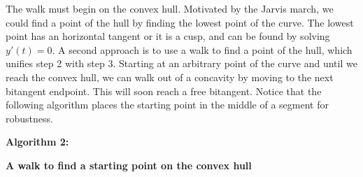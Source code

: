 \documentclass{sig-alternate}
\newcommand{\Comment}[1]{\relax}  %
\begin{document}
The walk must begin on the convex hull.
Motivated by the Jarvis march, we could find a point of the hull by finding the lowest
point of the curve.
The lowest point has an horizontal tangent or it is a cusp, and can be found by
solving $y'(t) = 0$.
A second approach is to use a walk to find a point of the hull, which unifies step 2 with
step 3.
Starting at an arbitrary point of the curve
and until we reach the convex hull, we can walk out of a concavity
by moving to the next bitangent endpoint.
This will soon reach a free bitangent.
Notice that the following algorithm places the starting point in the middle of a segment 
for robustness.
\Comment{
\item if the tangent at $C(a)$ does not intersect $C$
\begin{itemize}
\item if $a=e_i$ (some bitangent endpoint)
\begin{itemize}
\item if the tangent at $C(\frac{e_i + e_{i \oplus 1}}{2})$ does not intersect the curve
\begin{itemize}
\item choose $\frac{e_i + e_{i \oplus 1}}{2}$ as the starting point.
\end{itemize}
\item else choose $\frac{e_{i \ominus 1} + e_i}{2}$ as the starting point.
\end{itemize}
\item else choose $a$ as the starting point.
\end{itemize}
\item else
\begin{itemize}
}

\vspace{.2in}

\centerline{{\bf Algorithm 2:}}
\centerline{{\bf A walk to find a starting point on the convex hull}}
\end{document}
